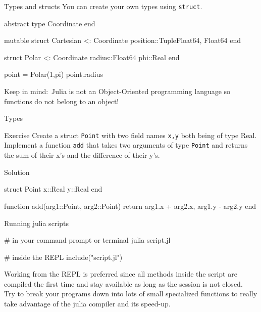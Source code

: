 \documentclass{beamer}
\newenvironment{Boxx}{\begin{tcolorbox}[standard jigsaw, opacityframe=0.8, opacityback=0.0]}{\end{tcolorbox}}
\begin{document}
\begin{frame}[fragile]{Types and structs}
 You can create your own types using \verb|struct|.
 \begin{Boxx}
  \begin{jllisting}
  abstract type Coordinate end
  
  mutable struct Cartesian <: Coordinate
    position::Tuple{Float64, Float64}
  end
  
  struct Polar <: Coordinate
    radius::Float64
    phi::Real
  end
  
  point = Polar(1,pi)
  point.radius
  \end{jllisting}
\end{Boxx}
Keep in mind:~Julia is not an Object-Oriented programming language so functions do not belong to an object!
\end{frame}

\begin{frame}[fragile]{Types}
	\begin{block}{Exercise}
		Create a struct \verb|Point| with two field names \verb|x,y| both being of type Real. Implement a function \verb|add| that takes two arguments of type \verb|Point| and returns the sum of their x's and the difference of their y's.
	\end{block}
	\vfill
	\begin{block}{Solution}
		\begin{jllisting}
  struct Point
    x::Real
    y::Real
  end
  
  function add(arg1::Point, arg2::Point)
    return arg1.x + arg2.x, arg1.y - arg2.y
  end
		\end{jllisting}
	\end{block}
\end{frame}



\begin{frame}[fragile]{Running julia scripts}
	\begin{Boxx}
 \begin{jllisting}
  # in your command prompt or terminal
  julia script.jl
  
  # inside the REPL
  include("script.jl")
\end{jllisting}
\end{Boxx}
Working from the REPL is preferred since all methods inside the script are compiled the first time and stay available as long as the session is not closed.\\

\vspace{4mm}
Try to break your programs down into lots of small specialized functions to really take advantage of the julia compiler and its speed-up.
\end{frame}
\end{document}
